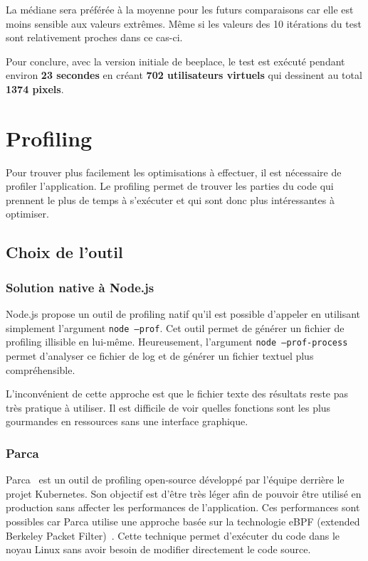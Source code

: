La médiane sera préférée à la moyenne pour les futurs comparaisons car elle est moins sensible aux valeurs extrêmes. Même si les valeurs des 10 itérations du test sont relativement proches dans ce cas-ci.

Pour conclure, avec la version initiale de \gls{beeplace}, le test est exécuté pendant environ \textbf{23 secondes} en créant \textbf{702 utilisateurs virtuels} qui dessinent au total \textbf{1374 pixels}.

\section{Profiling}

Pour trouver plus facilement les optimisations à effectuer, il est nécessaire de profiler l'application. Le profiling permet de trouver les parties du code qui prennent le plus de temps à s'exécuter et qui sont donc plus intéressantes à optimiser.

\subsection{Choix de l'outil}

\subsubsection{Solution native à Node.js}

Node.js propose un outil de profiling natif qu'il est possible d'appeler en utilisant simplement l'argument \texttt{node --prof}. Cet outil permet de générer un fichier de profiling illisible en lui-même. Heureusement, l'argument \texttt{node --prof-process} permet d'analyser ce fichier de log et de générer un fichier textuel plus compréhensible.

L'inconvénient de cette approche est que le fichier texte des résultats reste pas très pratique à utiliser. Il est difficile de voir quelles fonctions sont les plus gourmandes en ressources sans une interface graphique.

\subsubsection{Parca}

Parca~\cite{parca} est un outil de profiling open-source développé par l'équipe derrière le projet Kubernetes. Son objectif est d'être très léger afin de pouvoir être utilisé en production sans affecter les performances de l'application. Ces performances sont possibles car Parca utilise une approche basée sur la technologie eBPF (extended Berkeley Packet Filter)~\cite{ebpf}. Cette technique permet d'exécuter du code dans le noyau Linux sans avoir besoin de modifier directement le code source.

